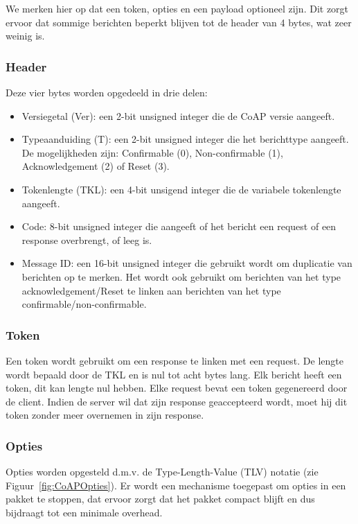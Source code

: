 We merken hier op dat een token, opties en een payload optioneel zijn. Dit zorgt ervoor dat sommige berichten beperkt blijven tot de header van 4 bytes, wat zeer weinig is.

\subsubsection{Header}

Deze vier bytes worden opgedeeld in drie delen:
\begin{itemize}
\item Versiegetal (Ver): een 2-bit unsigned integer die de CoAP versie aangeeft. 
\item Typeaanduiding (T): een 2-bit unsigned integer die het berichttype aangeeft. De mogelijkheden zijn: Confirmable (0), Non-confirmable (1), Acknowledgement (2) of Reset (3).
\item Tokenlengte (TKL): een 4-bit unsigend integer die de variabele tokenlengte aangeeft.
\item Code: 8-bit unsigned integer die aangeeft of het bericht een request of een response overbrengt, of leeg is.
\item Message ID: een 16-bit unsigned integer die gebruikt wordt om duplicatie van berichten op te merken. Het wordt ook gebruikt om berichten van het type acknowledgement/Reset te linken aan berichten van het type confirmable/non-confirmable.
\end{itemize}

\subsubsection{Token}

Een token wordt gebruikt om een response te linken met een request. De lengte wordt bepaald door de TKL en is nul tot acht bytes lang. Elk bericht heeft een token, dit kan lengte nul hebben. Elke request bevat een token gegenereerd door de client. Indien de server wil dat zijn response geaccepteerd wordt, moet hij dit token zonder meer overnemen in zijn response.

\newpage

\subsubsection{Opties}

Opties worden opgesteld d.m.v. de Type-Length-Value (TLV) notatie (zie Figuur~\ref{fig:CoAPOpties}). Er wordt een mechanisme toegepast om opties in een pakket te stoppen, dat ervoor zorgt dat het pakket compact blijft en dus bijdraagt tot een minimale overhead.

